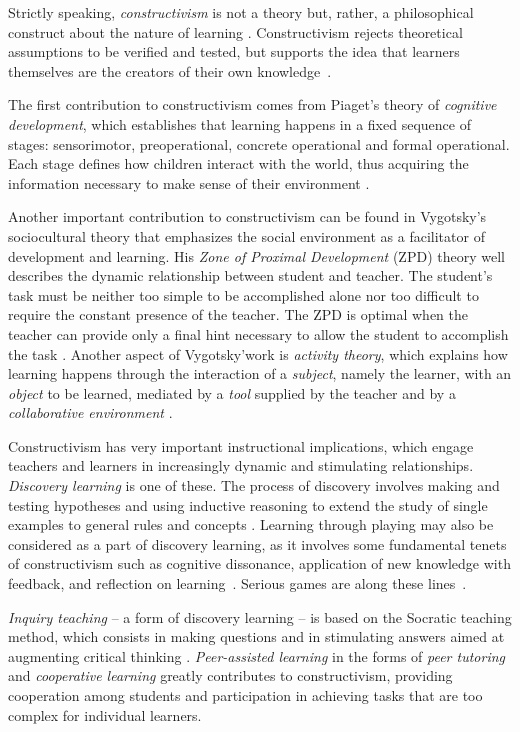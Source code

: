 \documentclass[10pt,journal,compsoc]{IEEEtran}
\begin{document}
Strictly speaking, \textit{constructivism} is not a theory but, rather, a philosophical construct about the nature of learning  \cite{hyslop2007constructivism}. Constructivism rejects theoretical assumptions to be verified and tested, but supports the idea that learners themselves are the creators of their own knowledge~\cite{geary1995reflections}. 

The first contribution to constructivism comes from Piaget's theory of \textit{cognitive development}, which establishes that learning happens in a fixed sequence of stages: sensorimotor, preoperational, concrete operational and formal operational. Each stage defines how children interact with the world, thus acquiring the information necessary to make sense of their environment \cite{piaget1952origins}. 

Another important contribution to constructivism can be found in Vygotsky's sociocultural theory that emphasizes the social environment as a facilitator of development and learning. His \textit{Zone of Proximal Development} (ZPD) theory well describes the dynamic relationship between student and teacher. The student's task must be neither too simple to be accomplished alone nor too difficult to require the constant presence of the teacher. The ZPD is optimal when the teacher can provide only a final hint necessary to allow the student to accomplish the task \cite{vygotsky1980mind}. Another aspect of Vygotsky'work is \textit{activity theory}, which explains how learning happens through the interaction of a \textit{subject}, namely the learner, with an \textit{object} to be learned, mediated by a \textit{tool} supplied by the teacher and by a \textit{collaborative environment} 
\cite{jonassen1999activity}.

Constructivism has very important instructional implications, which engage teachers and learners in increasingly dynamic and stimulating relationships. \textit{Discovery learning} is one of these. The process of discovery involves making and testing hypotheses and using inductive reasoning to extend the study of single examples to general rules and concepts \cite{bruner1961act}. Learning through playing may also be considered as a part of discovery learning, as it involves some fundamental tenets of constructivism such as cognitive dissonance, application of new knowledge with feedback, and reflection on learning~\cite{baviskar2009essential}. Serious games are along these lines~\cite{barate2013serious}.

\textit{Inquiry teaching} -- a form of discovery learning -- is based on the Socratic teaching method, which consists in making questions and in stimulating answers aimed at augmenting critical thinking \cite{stevens2013cognitive}. \textit{Peer-assisted learning} in the forms of \textit{peer tutoring} and \textit{cooperative learning} greatly contributes to constructivism, providing cooperation among students and participation in achieving tasks that are too complex for individual learners. 
\end{document}
